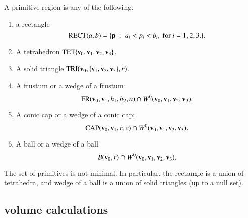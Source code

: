 \begin{definition}[primitive]\label{def:primitive} 
A primitive region is any of the following.

\begin{enumerate}%
\item a rectangle 
\begin{displaymath}
{\operatorname{RECT}}(a,b)=\{{\mathbf p} \ :\  a_i < p_i < b_i,\text { for } i=1,2,3.\}.
\end{displaymath}
\item A tetrahedron ${\operatorname{TET}}\{{\mathbf v}_0,{\mathbf v}_1,{\mathbf v}_2,{\mathbf v}_3\}$.
\item A solid triangle ${\operatorname{TRI}}({\mathbf v}_0,\{{\mathbf v}_1,{\mathbf v}_2,{\mathbf v}_3\},r)$.
%
\item A frustum or a wedge of a frustum:
\begin{displaymath}
{\operatorname{FR}}({\mathbf v}_0,{\mathbf v}_1,h_1,h_2,a) \cap W^0({\mathbf v}_0,{\mathbf v}_1,{\mathbf v}_2,{\mathbf v}_3).
\end{displaymath}
\item A conic cap or a wedge of a conic cap: 
\begin{displaymath}
{\operatorname{CAP}}({\mathbf v}_0,{\mathbf v}_1,r,c) \cap W^0({\mathbf v}_0,{\mathbf v}_1,{\mathbf v}_2,{\mathbf v}_3).
\end{displaymath}
\item A ball or a wedge of a ball
\begin{displaymath}
B({\mathbf v}_0,r) \cap W^0({\mathbf v}_0,{\mathbf v}_1,{\mathbf v}_2,{\mathbf v}_3).
\end{displaymath}
%
%
%
%
%
%
%
\label{enum:volume-prim}
\end{enumerate}
The set of primitives is not minimal.  In particular, the
rectangle is a union of tetrahedra, and wedge of a ball is a union of
solid triangles (up to a null set).

\end{definition}

\subsection{volume calculations}\label{sec:primitive}

